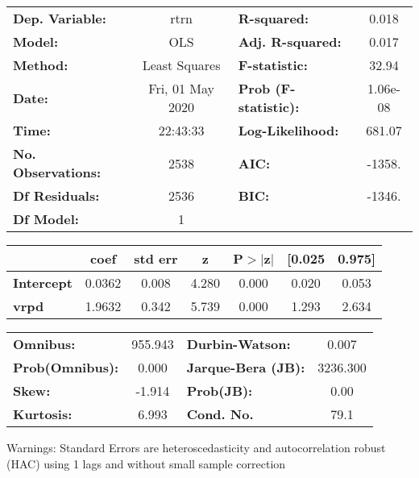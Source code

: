 \begin{center}
\begin{tabular}{lclc}
\toprule
\textbf{Dep. Variable:}    &       rtrn       & \textbf{  R-squared:         } &     0.018   \\
\textbf{Model:}            &       OLS        & \textbf{  Adj. R-squared:    } &     0.017   \\
\textbf{Method:}           &  Least Squares   & \textbf{  F-statistic:       } &     32.94   \\
\textbf{Date:}             & Fri, 01 May 2020 & \textbf{  Prob (F-statistic):} &  1.06e-08   \\
\textbf{Time:}             &     22:43:33     & \textbf{  Log-Likelihood:    } &    681.07   \\
\textbf{No. Observations:} &        2538      & \textbf{  AIC:               } &    -1358.   \\
\textbf{Df Residuals:}     &        2536      & \textbf{  BIC:               } &    -1346.   \\
\textbf{Df Model:}         &           1      & \textbf{                     } &             \\
\bottomrule
\end{tabular}
\begin{tabular}{lcccccc}
                   & \textbf{coef} & \textbf{std err} & \textbf{z} & \textbf{P$> |$z$|$} & \textbf{[0.025} & \textbf{0.975]}  \\
\midrule
\textbf{Intercept} &       0.0362  &        0.008     &     4.280  &         0.000        &        0.020    &        0.053     \\
\textbf{vrpd}      &       1.9632  &        0.342     &     5.739  &         0.000        &        1.293    &        2.634     \\
\bottomrule
\end{tabular}
\begin{tabular}{lclc}
\textbf{Omnibus:}       & 955.943 & \textbf{  Durbin-Watson:     } &    0.007  \\
\textbf{Prob(Omnibus):} &   0.000 & \textbf{  Jarque-Bera (JB):  } & 3236.300  \\
\textbf{Skew:}          &  -1.914 & \textbf{  Prob(JB):          } &     0.00  \\
\textbf{Kurtosis:}      &   6.993 & \textbf{  Cond. No.          } &     79.1  \\
\bottomrule
\end{tabular}
\end{center}

Warnings: \newline
 [1] Standard Errors are heteroscedasticity and autocorrelation robust (HAC) using 1 lags and without small sample correction